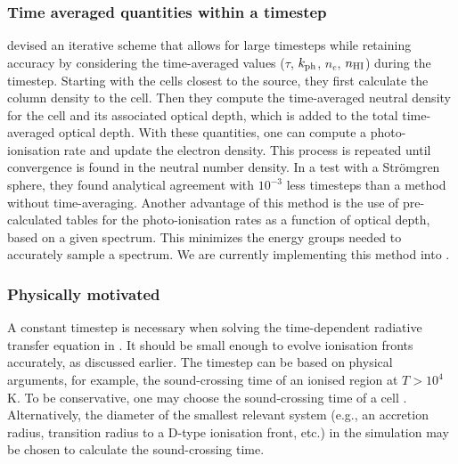 \documentclass[useAMS,usenatbib]{mn2e}
\begin{document}
\subsubsection{Time averaged quantities within a timestep}

\citet{Mellema06} devised an iterative scheme that allows for large
timesteps while retaining accuracy by considering the time-averaged
values ($\tau$, $k_{\rm ph}$, $n_e$, $n_{\rm HI}$) during the
timestep.  Starting with the cells closest to the source, they first
calculate the column density to the cell.  Then they compute the
time-averaged neutral density for the cell and its associated optical
depth, which is added to the total time-averaged optical depth.  With
these quantities, one can compute a photo-ionisation rate and update
the electron density.  This process is repeated until convergence is
found in the neutral number density.  In a test with a Str\"{o}mgren
sphere, they found analytical agreement with $10^{-3}$ less timesteps
than a method without time-averaging.  Another advantage of this
method is the use of pre-calculated tables for the photo-ionisation
rates as a function of optical depth, based on a given spectrum.  This
minimizes the energy groups needed to accurately sample a spectrum.
We are currently implementing this method into \moray.

\subsubsection{Physically motivated}
\label{sec:dt_const}

A constant timestep is necessary when solving the time-dependent
radiative transfer equation in \moray.  It should be small enough
to evolve ionisation fronts accurately, as discussed earlier.  The
timestep can be based on physical arguments, for example, the
sound-crossing time of an ionised region at $T > 10^4$ K.  To be
conservative, one may choose the sound-crossing time of a cell
\citep[e.g.][]{Abel07, Wise08_Gal}.  Alternatively, the diameter of
the smallest relevant system (e.g., an accretion radius, transition
radius to a D-type ionisation front, etc.) in the simulation may be
chosen to calculate the sound-crossing time.
\end{document}
